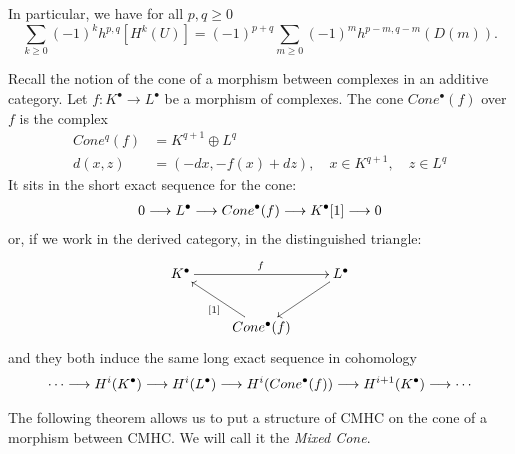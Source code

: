 \documentclass[../main.tex]{subfiles}
\begin{document}

In particular, we have for all $p,q \geq 0$
\[
\sum_{k \geq 0} (-1)^k h^{p,q} [H^k(U)] = (-1)^{p+q} \sum_{m \geq 0 } (-1)^m h^{p-m,q-m} (D(m)).
\]





Recall the notion of the cone of a morphism between complexes in an additive category.
Let $f \colon K^\bullet \to L^\bullet$ be a morphism of complexes. The cone $Cone^\bullet(f)$ over $f$ is the complex 
\begin{align*}
    Cone^q(f) &= K^{q+1} \oplus L^q \\
    d(x,z) &= (-dx,-f(x)+dz), \quad x \in K^{q+1}, \quad z \in L^q
\end{align*}
It sits in the short exact sequence for the cone:
\begin{align} \label{SESCone}
    0 \longrightarrow L^\bullet \longrightarrow Cone^\bullet(f) \longrightarrow K^\bullet[1] \longrightarrow 0 
\end{align}
or, if we work in the derived category, in the distinguished triangle:
\begin{align}  \label{TriCone}
\xymatrix{
K^\bullet \ar[rr]^{f} && L^\bullet  \ar[dl]  \\
& Cone^\bullet(f) \ar[ul]^{[1]}  &
}
\end{align}
and they both induce the same long exact sequence in cohomology
\begin{align} \label{LES}
    \cdots \longrightarrow H^i(K^\bullet) \longrightarrow H^i(L^\bullet) \longrightarrow H^i(Cone^\bullet(f))\longrightarrow H^{i+1}(K^\bullet) \longrightarrow  \cdots 
\end{align}

The following theorem allows us to put a structure of CMHC on the cone of a morphism between CMHC. We will call it the \emph{Mixed Cone}.
\end{document}
